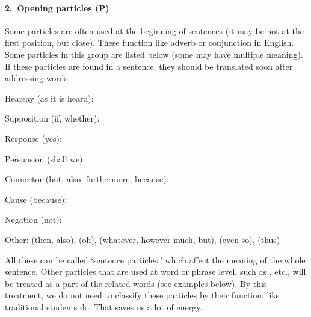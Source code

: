 \paragraph*{2.\ Opening particles (\textbf{P})} Some particles are often used at the beginning of sentences (it may be not at the first position, but close). These function like adverb or conjunction in English. Some particles in this group are listed below (some may have multiple meaning). If these particles are found in a sentence, they should be translated soon after addressing words.\par
\begin{compactenum}[(1)]
\item Hearsay (as it is heard): \par
\item Supposition (if, whether): \par
\item Response (yes): \par
\item Persuasion (shall we):  \par
\item Connector (but, also, furthermore, because):  \par
\item Cause (because):  \par
\item Negation (not):  \par
\item Other:  (then, also),  (oh),  (whatever, however much, but),  (even so),  (thus) \par
\end{compactenum}

All these can be called `sentence particles,' which affect the meaning of the whole sentence. Other particles that are used at word or phrase level, such as , etc., will be treated as a part of the related words (see examples below). By this treatment, we do not need to classify these particles by their function, like traditional students do. That saves us a lot of energy.

